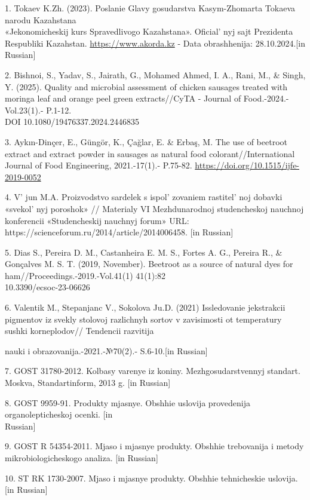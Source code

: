 \begin{references}
1. Tokaev K.Zh. (2023). Poslanie Glavy gosudarstva Kasym-Zhomarta
Tokaeva narodu Kazahstana \\«Jekonomicheskij kurs Spravedlivogo
Kazahstana». Oficial' nyj sajt Prezidenta Respubliki
Kazahstan.
\href{https://www.akorda.kz/ru/poslanie-glavy-gosudarstva-kasym-zhomarta-tokaeva-narodu-kazahstana-ekonomicheskiy-kurs-spravedlivogo-kazahstana-18588}{https://www.akorda.kz}
- Data obrashhenija: 28.10.2024.{[}in Russian{]}

2. Bishnoi, S., Yadav, S., Jairath, G., Mohamed Ahmed, I. A., Rani, M.,
\& Singh, Y. (2025). Quality and microbial assessment of chicken
sausages treated with moringa leaf and orange peel green extracts//CyTA
- Journal of Food.-2024.-Vol.23(1).- P.1-12.\\
DOI 10.1080/19476337.2024.2446835

3. Aykın-Dinçer, E., Güngör, K., Çağlar, E. \& Erbaş, M. The use of
beetroot extract and extract powder in sausages as natural food
colorant//International Journal of Food Engineering, 2021.-17(1).-
P.75-82. \url{https://doi.org/10.1515/ijfe-2019-0052}{}

4. V' jun M.A. Proizvodstvo sardelek s
ispol' zovaniem rastitel' noj dobavki
«svekol' nyj poroshok» // Materialy VI Mezhdunarodnoj
studencheskoj nauchnoj konferencii «Studencheskij nauchnyj forum» URL:
https://scienceforum.ru/2014/article/2014006458. {[}in Russian{]}

5. Dias S., Pereira D. M., Castanheira E. M. S., Fortes A. G., Pereira
R., \& Gonçalves M. S. T. (2019, November). Beetroot as a source of
natural dyes for ham//Proceedings.-2019.-Vol.41(1) 41(1):82\\
10.3390/ecsoc-23-06626

6. Valentik M., Stepanjanc V., Sokolova Ju.D. (2021) Issledovanie
jekstrakcii pigmentov iz svekly stolovoj razlichnyh sortov v zavisimosti
ot temperatury sushki korneplodov// Tendencii razvitija

nauki i obrazovanija.-2021.-№70(2).- S.6-10.{[}in Russian{]}

7. GOST 31780-2012. Kolbasy varenye iz koniny. Mezhgosudarstvennyj
standart. Moskva, Standartinform, 2013 g. {[}in Russian{]}

8. GOST 9959-91. Produkty mjasnye. Obshhie uslovija provedenija
organolepticheskoj ocenki. {[}in \\Russian{]}

9. GOST R 54354-2011. Mjaso i mjasnye produkty. Obshhie trebovanija i
metody mikrobiologicheskogo analiza. {[}in Russian{]}

10. ST RK 1730-2007. Mjaso i mjasnye produkty. Obshhie tehnicheskie
uslovija. {[}in Russian{]}
\end{references}

